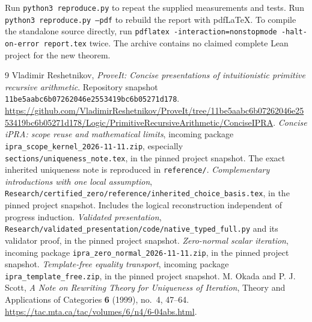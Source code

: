 \documentclass[11pt]{article}
\theoremstyle{definition}\newtheorem{definition}[theorem]{Definition}
\newcommand{\file}[1]{{\small\nolinkurl{#1}}}
\begin{document}
Run \texttt{python3 reproduce.py} to repeat the supplied measurements and
tests.  Run \texttt{python3 reproduce.py --pdf} to rebuild the report with
pdfLaTeX.  To compile the standalone source directly, run
\texttt{pdflatex -interaction=nonstopmode -halt-on-error report.tex} twice.
The archive contains no claimed complete Lean project for the new theorem.

\begin{thebibliography}{9}
\footnotesize\setlength{\itemsep}{3pt}
 Vladimir Reshetnikov, \emph{ProveIt: Concise presentations
of intuitionistic primitive recursive arithmetic}.  Repository snapshot
\texttt{11be5aabc6b07262046e2553419bc6b05271d178}.
\url{https://github.com/VladimirReshetnikov/ProveIt/tree/11be5aabc6b07262046e2553419bc6b05271d178/Logic/PrimitiveRecursiveArithmetic/ConciseIPRA}.
 \emph{Concise iPRA: scope reuse and mathematical limits},
incoming package \file{ipra_scope_kernel_2026-11-11.zip}, especially
\file{sections/uniqueness_note.tex}, in the pinned project snapshot.
The exact inherited uniqueness note is reproduced in \file{reference/}.
 \emph{Complementary introductions with one local assumption},
\file{Research/certified_zero/reference/inherited_choice_basis.tex},
in the pinned project snapshot.  Includes the logical reconstruction
independent of progress induction.
 \emph{Validated presentation},
\file{Research/validated_presentation/code/native_typed_full.py}
and its validator proof, in the pinned project snapshot.
 \emph{Zero-normal scalar iteration}, incoming package
\file{ipra_zero_normal_2026-11-11.zip}, in the pinned project snapshot.
 \emph{Template-free equality transport}, incoming
package \file{ipra_template_free.zip}, in the pinned project snapshot.
 M. Okada and P. J. Scott,
\emph{A Note on Rewriting Theory for Uniqueness of Iteration},
Theory and Applications of Categories \textbf{6} (1999), no.~4, 47--64.
\url{https://tac.mta.ca/tac/volumes/6/n4/6-04abs.html}.
\end{thebibliography}
\end{document}

